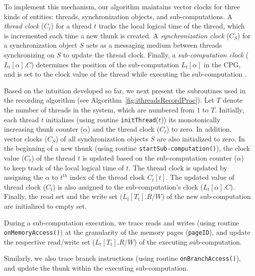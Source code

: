 To implement this mechanism, our algorithm maintains vector clocks for three kinds of
entities: threads,  synchronization objects, and sub-computations.  A {\em thread clock}
($C_t$) for a thread $t$ tracks the local logical time of the thread, which is
incremented each time a new thunk is created. A {\em synchronization clock}
($C_S$) for a synchronization object $S$ acts as a messaging medium  between
threads synchronizing on $S$ to update the thread clock. Finally, a {\em  sub-computation clock}
($L_t[\alpha].C$) determines the position of the sub-computation $L_t[\alpha]$
in the CPG, and is set to the clock value of the thread while executing the
sub-computation . 



Based on the intuition developed so far, we next present the
subroutines used in the recording algorithm (see
Algorithm~\ref{fig:ithreadsRecordProc}). Let $T$ denote the number of threads in the system, which are numbered from $1$ to $T$.  Initially, each thread $t$ initializes (using routine {\tt initThread}($t$)) its monotonically increasing thunk
counter ($\alpha$) and the thread clock ($C_t$) to zero. In addition, vector clocks ($C_S$) of all synchronization objects $S$ are also initialized to zero. 
In the beginning of a new thunk (using routine {\tt startSub-computation()}), the clock value ($C_t$) of the thread $t$ is
updated based on the sub-computation  counter ($\alpha$) to keep track of the local logical time of $t$. The thread clock is updated by assigning the $\alpha$ to $t^{th}$ index of the thread clock $C_t[t]$. The updated value of thread clock ($C_t$)   is also assigned to the sub-computation's clock ($L_t[\alpha].C$). Finally, the read set and the write set
($L_t[T_t].R/W$) of the new sub-computation are initialized to empty set.

During a sub-computation execution, we trace reads and writes  (using routine {\tt onMemoryAccess()}) at the granularity of the
memory pages ({\tt pageID}), and update the respective read/write set
($L_t[T_t].R/W$) of the executing sub-computation.  

Similarly, we also trace branch instructions (using routine {\tt onBranchAccess()}), and update the thunk within the executing sub-computation.

